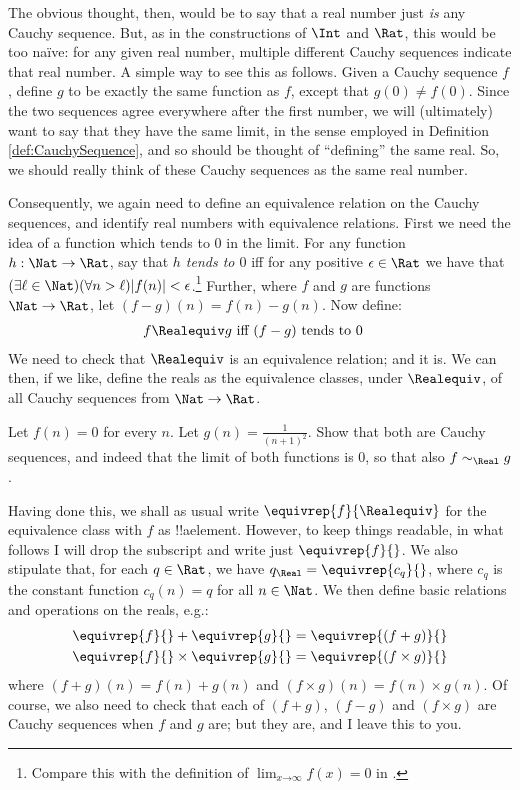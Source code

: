 \documentclass[../../../include/open-logic-section]{subfiles}
\begin{document}
The obvious thought, then, would be to say that a real number just \emph{is} any Cauchy sequence. But, as in the constructions of $\Int$ and $\Rat$, this would be too na\"{i}ve: for any given real number, multiple different Cauchy sequences indicate that real number. A simple way to see this as follows. Given a Cauchy sequence $f$, define $g$ to be exactly the same function as $f$, except that $g(0)\neq f(0)$. Since the two sequences agree everywhere after the first number, we will (ultimately) want to say that they have the same limit, in the sense employed in Definition \ref{def:CauchySequence}, and so should be thought of ``defining'' the same real. So, we should really think of these Cauchy sequences as the same real number.

Consequently, we again need to define an equivalence relation on the Cauchy sequences, and identify real numbers with equivalence relations. First we need the idea of a function which tends to $0$ in the limit. For any function $h : \Nat \to \Rat$, say that \emph{$h$ tends to $0$} iff for any positive $\epsilon \in \Rat$ we have that $(\exists \ell \in \Nat)(\forall n > \ell)|f(n)| < \epsilon$.\footnote{Compare this with the definition of $\lim_{x \mathord{\rightarrow}\infty}f(x) = 0$ in .} Further, where $f$ and $g$ are functions $\Nat \to \Rat$, let $(f-g)(n) = f(n) - g(n)$. Now define:
	\begin{align*}
		f \Realequiv g& \text{ iff }(f-g)\text{ tends to }0
	\end{align*}
We need to check that $\Realequiv$ is an equivalence relation; and it is. We can then, if we like, define the reals as the equivalence classes, under $\Realequiv$, of all Cauchy sequences from $\Nat \to \Rat$.
\begin{prob}
	Let $f(n) = 0$ for every $n$. Let $g(n) = \frac{1}{(n+1)^2}$. Show that both are Cauchy sequences, and indeed that the limit of both functions is $0$, so that also $f \sim_\Real g$. 
\end{prob}

Having done this, we shall as usual write $\equivrep{f}{\Realequiv}$ for the equivalence class with $f$ as !!a{element}. However, to keep things readable, in what follows I will drop the subscript and write just $\equivrep{f}{}$. We also stipulate that, for each $q \in \Rat$, we have $q_{\Real} = \equivrep{c_{q}}{}$, where $c_{q}$ is the constant function $c_q(n) = q$ for all $n \in \Nat$. We then define basic relations and operations on the reals, e.g.:
	\begin{align*}
		\equivrep{f}{} + \equivrep{g}{} &= 	\equivrep{(f + g)}{} \\
		\equivrep{f}{} \times 	\equivrep{g}{} &= \equivrep{(f \times g)}{} 
	\end{align*}
where $(f + g)(n) = f(n) + g(n)$ and $(f \times g)(n) = f(n) \times g(n)$. Of course, we also need to check that each of  $(f + g)$, $(f-g)$ and $(f\times g)$ are Cauchy sequences when $f$ and $g$ are; but they are, and I leave this to you.
\end{document}
